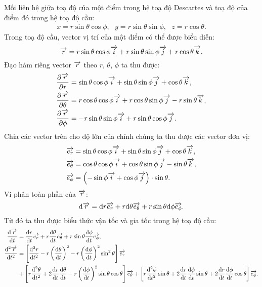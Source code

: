 \begin{appendices}
\begin{center}
\begin{tikzpicture}[x=0.75pt,y=0.75pt,yscale=-1,xscale=1]
\end{tikzpicture}

\end{center}
Mối liên hệ giữa toạ độ của một điểm trong hệ toạ độ Descartes và toạ độ của điểm đó trong hệ toạ độ cầu:
\begin{align*}
     x=r\sin{\theta}\cos{\phi},\text{   }y=r\sin{\theta}\sin{\phi},\text{   }z=r\cos{\theta}.
\end{align*}
Trong toạ độ cầu, vector vị trí của một điểm có  thể được biểu diễn:
$$\ot{r}=r\sin{\theta}\cos{\phi}\ot{i}+r\sin{\theta}\sin{\phi}\ot{j}+r\cos{\theta}\ot{k}.$$
Đạo hàm riêng vector $\ot{r}$ theo $r$, $\theta$, $\phi$ ta thu được:
\begin{align*}
    &\dfrac{\partial \ot{r}}{\partial r}= \sin{\theta}\cos{\phi}\ot{i}+\sin{\theta}\sin{\phi}\ot{j}+\cos{\theta}\ot{k},\\
    &\dfrac{\partial \ot{r}}{\partial \theta}=r\cos{\theta}\cos{\phi}\ot{i}+r\cos{\theta}\sin{\phi}\ot{j}-r\sin{\theta}\ot{k},\\
    &\dfrac{\partial \ot{r}}{\partial \phi}=-r\sin{\theta}\sin{\phi}\ot{i}+r\sin{\theta}\cos{\phi}\ot{j}.
\end{align*}
Chia các vector trên cho độ lớn của chính chúng ta thu được các vector đơn vị:
\begin{align*}
    &\ot{e_r}= \sin{\theta}\cos{\phi}\ot{i}+\sin{\theta}\sin{\phi}\ot{j}+\cos{\theta}\ot{k},\\
    &\ot{e_\theta}=\cos{\theta}\cos{\phi}\ot{i}+\cos{\theta}\sin{\phi}\ot{j}-\sin{\theta}\ot{k},\\
    &\ot{e_\phi}=\left(-\sin{\phi}\ot{i}+\cos{\phi}\ot{j}\right)\cdot\sin{\theta}.
\end{align*}
Vi phân toàn phần của $\ot{r}$:
$$\dd \ot{r}=\dd r\ot{e_r}+r\dd\theta\ot{e_\theta}+r\sin{\theta}\dd \phi\ot{e_\phi}.$$
Từ đó ta thu được biểu thức vận tốc và gia tốc trong hệ toạ độ cầu:
\begin{align*}
    \dfrac{\dd\ot{r}}{\dd t}&=\dfrac{\dd r}{\dd t}\ot{e_r}+r\dfrac{\dd \theta}{\dd t}\ot{e_\theta}+r\sin{\theta}\dfrac{\dd\phi}{\dd t}\ot{e_\phi},\\
    \dfrac{\dd^2\ot{r}}{\dd t^2}&=\left[\dfrac{\dd^2 r}{\dd t^2}-r\left(\dfrac{\dd \theta}{\dd t}\right)^2-r\left(\dfrac{\dd \phi}{\dd t}\right)^2\sin^2\theta \right] \ot{e_r}\\
    &+\left[r\dfrac{\dd^2 \theta}{\dd t^2}+2\dfrac{\dd r}{\dd t}\dfrac{\dd \theta}{\dd t}-r\left(\dfrac{\dd \phi}{\dd t}\right)^2\sin\theta\cos\theta\right]\ot{e_\theta}+\left[r\dfrac{\dd^2 \phi}{\dd t^2}\sin\theta+2\dfrac{\dd r}{\dd t}\dfrac{\dd \phi}{\dd t}\sin\theta+2\dfrac{\dd r}{\dd t}\dfrac{\dd \phi}{\dd t}\cos\theta\right]\ot{e_\phi}.

\end{align*}
\end{appendices}
